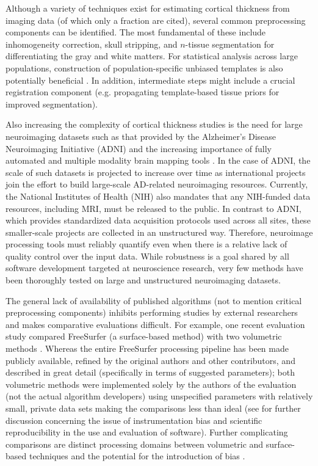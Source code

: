 Although a variety of techniques exist for estimating cortical thickness
from imaging data (of which only a fraction are cited), several common preprocessing components
can be identified.  The most fundamental of these include inhomogeneity correction, skull stripping, and $n$-tissue segmentation for differentiating the gray and white matters.  For statistical analysis 
across large populations, construction of population-specific unbiased templates
is also potentially beneficial \citep{evans2012}.
In addition, intermediate steps might include a crucial registration component (e.g. 
propagating template-based tissue priors for improved segmentation).

Also increasing the complexity of cortical thickness studies is
the need for large neuroimaging datasets such as that provided by the Alzheimer's
Disease Neuroimaging Initiative (ADNI) and the increasing importance
of fully automated and multiple modality brain mapping tools
\citep{Weiner2012}.  In the case of ADNI, the scale of such datasets is projected
to increase over time as international projects join the effort to build
large-scale AD-related neuroimaging resources.  Currently, the
National Institutes of Health (NIH) also mandates that any NIH-funded data
resources, including MRI, must be released to the public.  In contrast
to ADNI, which provides standardized data acquisition protocols used
across all sites, these smaller-scale projects are collected in an
unstructured way.  Therefore, neuroimage processing tools must
reliably quantify even when there is a relative lack of quality
control over the input data.  While robustness is a goal shared by all
software development targeted at neuroscience research, very few methods have
been thoroughly tested on large and unstructured neuroimaging datasets.


The general lack of availability of published
algorithms \citep{kovacevic2006} (not to mention critical preprocessing
components) inhibits performing studies by external researchers 
and makes comparative evaluations difficult.  For example, one recent evaluation 
study \citep{clarkson2011} compared
FreeSurfer (a surface-based method) with two volumetric methods \citep{jones2000,das2009}.
Whereas the entire FreeSurfer processing pipeline has been made publicly available, 
refined by the original authors and other contributors, and described in great detail 
(specifically in terms of suggested parameters); both volumetric methods were 
implemented solely by the authors of the evaluation (not the actual algorithm developers) 
using unspecified parameters with relatively small, private data sets
making the comparisons less than ideal (see \cite{tustison2013} for further discussion 
concerning the issue of instrumentation bias and scientific reproducibility in the use and evaluation of software). Further complicating comparisons are distinct 
processing domains between volumetric and surface-based techniques and the potential for the introduction of bias \citep{klein2010}.

